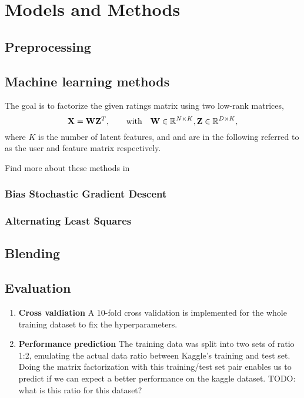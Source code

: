 \section{Models and Methods}

\subsection{Preprocessing}



\subsection{Machine learning methods}
\label{sec:methods}

The goal is to factorize the given ratings matrix using two low-rank matrices, 
\begin{equation}
  \mathbf{X} = \mathbf{W}\mathbf{Z}^T ,\hspace{2em} \text{with} \hspace{1em} \mathbf{W} \in\mathbb{R}^{N \times K},
  \mathbf{Z} \in\mathbb{R}^{D \times K}, 
\end{equation}
where $K$ is the number of latent features, and  and  are in the following
referred to as the user and feature matrix respectively.

Find more about these methods in \cite{Aberger2009}

\subsubsection{Bias Stochastic Gradient Descent}



\subsubsection{Alternating Least Squares}


\subsection{Blending}



\subsection{Evaluation}

\begin{enumerate}
  TODO: write about why kaggle results tend to be different than lcoal data for
    SGD, but not for ALS.
  \item \textbf{Cross valdiation} A 10-fold cross validation is implemented
    for the whole training dataset to fix the hyperparameters. 

  \item \textbf{Performance prediction} The training data was split into two
    sets of ratio 1:2, emulating the actual data ratio between Kaggle's training
    and test set. Doing the matrix factorization with this training/test set
    pair enables us to predict if we can expect a better performance on the
    kaggle dataset.  
    TODO: what is this ratio for this dataset? 
\end{enumerate}


